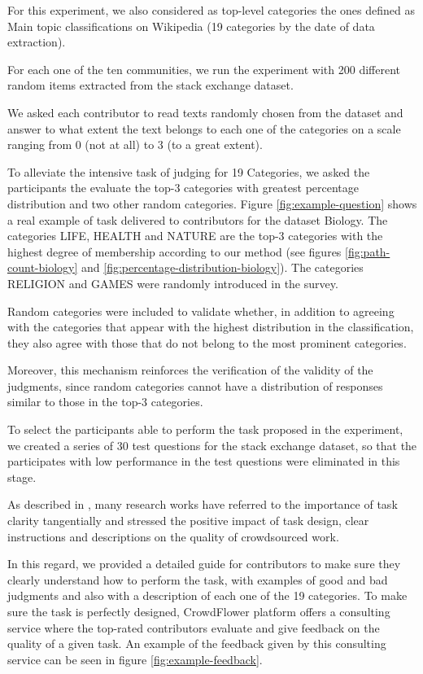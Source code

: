 For this experiment, we also considered as top-level categories the ones defined as Main topic classifications on Wikipedia (19 categories by the date of data extraction). 

For each one of the ten communities, we run the experiment with 200 different random items extracted from the stack exchange dataset. 

We asked each contributor to read texts randomly chosen from the dataset and answer to what extent the text belongs to each one of the categories on a scale ranging from 0 (not at all) to 3 (to a great extent). 

To alleviate the intensive task of judging for 19 Categories, we asked the participants the evaluate the top-3 categories with greatest percentage distribution and two other random categories.  Figure \ref{fig:example-question} shows a real example of task delivered to contributors for the dataset Biology. The categories LIFE, HEALTH and NATURE are the top-3 categories with the highest degree of membership according to our method (see figures \ref{fig:path-count-biology} and \ref{fig:percentage-distribution-biology}). The categories RELIGION and GAMES were randomly introduced in the survey. 

Random categories were included to validate whether, in addition to agreeing with the categories that appear with the highest distribution in the classification, they also agree with those that do not belong to the most prominent categories.  

Moreover, this mechanism reinforces the verification of the validity of the judgments, since random categories cannot have a distribution of responses similar to those in the top-3 categories.

To select the participants able to perform the task proposed in the experiment, we created a series of 30 test questions for the stack exchange dataset, so that the participates with low performance in the test questions were eliminated in this stage.


As described in \cite{Gadiraju:2017}, many research works have referred to the importance of task clarity tangentially and stressed the positive impact of task design, clear instructions and descriptions on the quality of crowdsourced work. 

In this regard, we provided a detailed guide for contributors to make sure they clearly understand how to perform the task, with examples of good and bad judgments and also with a description of each one of the 19 categories. To make sure the task is perfectly designed, CrowdFlower platform offers a consulting service where the top-rated contributors evaluate and give feedback on the quality of a given task. An example of the feedback given by this consulting service can be seen in figure \ref{fig:example-feedback}. 

